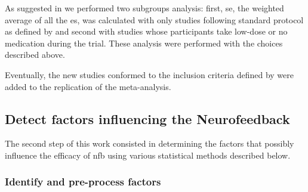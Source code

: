 As suggested in \citet{Cortese2016} we performed two subgroups analysis: first, \gls{se}, the weighted average of all the \gls{es}, was calculated with only studies following 
standard protocol as defined by \citet{Arns2014} and second with studies whose participants take low-dose or no medication during the trial. 
These analysis were performed with the choices described above. 

Eventually, the new studies conformed to the inclusion criteria defined by \citeauthor{Cortese2016} were added to the replication of the meta-analysis. 

\subsection{Detect factors influencing the Neurofeedback}

The second step of this work consisted in determining the factors that possibly influence the efficacy of \gls{nfb} using various statistical
 methods described below. 

\subsubsection{Identify and pre-process factors}

